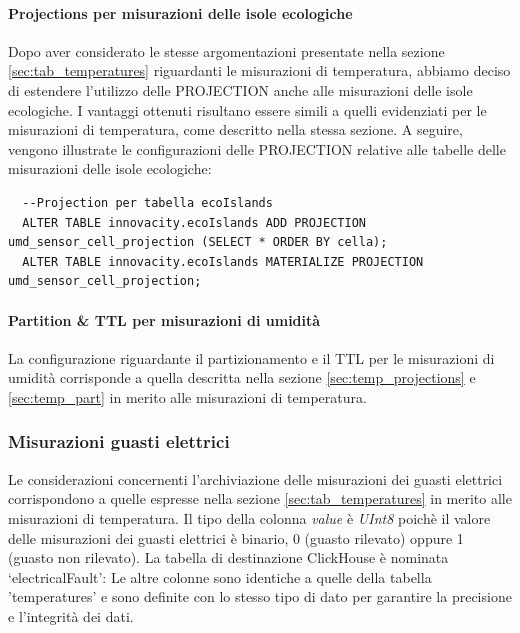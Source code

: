 \paragraph{Projections per misurazioni delle isole ecologiche} 
Dopo aver considerato le stesse argomentazioni presentate nella sezione \ref{sec:tab_temperatures} riguardanti le misurazioni di temperatura, abbiamo deciso di estendere l'utilizzo delle PROJECTION anche alle misurazioni delle isole ecologiche. I vantaggi ottenuti risultano essere simili a quelli evidenziati per le misurazioni di temperatura, come descritto nella stessa sezione. A seguire, vengono illustrate le configurazioni delle PROJECTION relative alle tabelle delle misurazioni delle isole ecologiche:

\begin{lstlisting}
  --Projection per tabella ecoIslands
  ALTER TABLE innovacity.ecoIslands ADD PROJECTION umd_sensor_cell_projection (SELECT * ORDER BY cella);
  ALTER TABLE innovacity.ecoIslands MATERIALIZE PROJECTION umd_sensor_cell_projection;
\end{lstlisting}

\paragraph{Partition \& TTL per misurazioni di umidità}
La configurazione riguardante il partizionamento e il TTL per le misurazioni di umidità corrisponde a quella descritta nella sezione \ref{sec:temp_projections} e \ref{sec:temp_part} in merito alle misurazioni di temperatura.


\subsubsection{Misurazioni guasti elettrici} \label{sec:tab_guasti}
Le considerazioni concernenti l'archiviazione delle misurazioni dei guasti elettrici corrispondono a quelle espresse nella sezione \ref{sec:tab_temperatures} in merito alle misurazioni di temperatura.
Il tipo della colonna \textit{value} è \textit{UInt8} poichè il valore delle misurazioni dei guasti elettrici è binario, 0 (guasto rilevato) oppure 1 (guasto non rilevato). La tabella di destinazione ClickHouse è nominata ‘electricalFault’:
Le altre colonne sono identiche a quelle della tabella 'temperatures' e sono definite con lo stesso tipo di dato per garantire la precisione e l'integrità dei dati.

